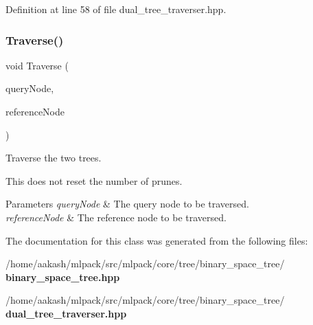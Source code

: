 Definition at line 58 of file dual\+\_\+tree\+\_\+traverser.\+hpp.

\mbox{\label{classmlpack_1_1tree_1_1BinarySpaceTree_1_1DualTreeTraverser_addfcfe8d6ac4ef7fef8b6f99324a69b2}} 
\subsubsection{Traverse()}
{\footnotesize\ttfamily void Traverse (\begin{DoxyParamCaption}\item[{\textbf{ Binary\+Space\+Tree} \&}]{query\+Node,  }\item[{\textbf{ Binary\+Space\+Tree} \&}]{reference\+Node }\end{DoxyParamCaption})}



Traverse the two trees. 

This does not reset the number of prunes.


\begin{DoxyParams}{Parameters}
{\em query\+Node} & The query node to be traversed. \\
\hline
{\em reference\+Node} & The reference node to be traversed. \\
\hline
\end{DoxyParams}


The documentation for this class was generated from the following files\+:\begin{DoxyCompactItemize}
\item 
/home/aakash/mlpack/src/mlpack/core/tree/binary\+\_\+space\+\_\+tree/\textbf{ binary\+\_\+space\+\_\+tree.\+hpp}\item 
/home/aakash/mlpack/src/mlpack/core/tree/binary\+\_\+space\+\_\+tree/\textbf{ dual\+\_\+tree\+\_\+traverser.\+hpp}\end{DoxyCompactItemize}
